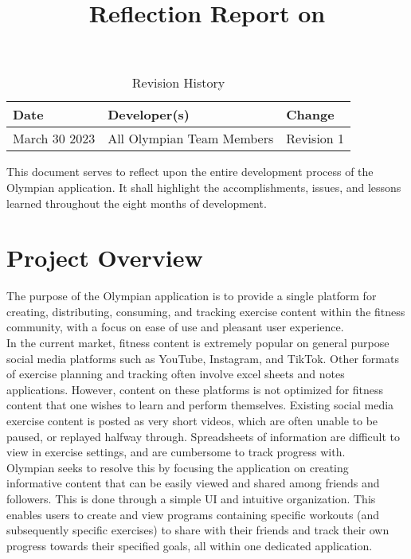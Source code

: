 \documentclass{article}
\title{Reflection Report on \progname}
\author{\authname}
\date{}
\begin{document}
\begin{table}[hp]
\caption{Revision History} \label{TblRevisionHistory}
\begin{tabularx}{\textwidth}{llX}
\toprule
\textbf{Date} & \textbf{Developer(s)} & \textbf{Change}\\
\midrule
March 30 2023 & All Olympian Team Members & Revision 1\\
\bottomrule
\end{tabularx}
\end{table}

\newpage

\maketitle

This document serves to reflect upon the entire development process of the Olympian application. It shall highlight the accomplishments, issues, and lessons learned throughout the eight months of development.

\section{Project Overview}


The purpose of the Olympian application is to provide a single platform for creating, distributing, consuming, and tracking exercise content within the fitness community, with a focus on ease of use and pleasant user experience.\\

In the current market, fitness content is extremely popular on general purpose social media platforms such as YouTube, Instagram, and TikTok. Other formats of exercise planning and tracking often involve excel sheets and notes applications. However, content on these platforms is not optimized for fitness content that one wishes to learn and perform themselves. Existing social media exercise content is posted as very short videos, which are often unable to be paused, or replayed halfway through. Spreadsheets of information are difficult to view in exercise settings, and are cumbersome to track progress with. \\

Olympian seeks to resolve this by focusing the application on creating informative content that can be easily viewed and shared among friends and followers. This is done through a simple UI and intuitive organization. This enables users to create and view programs containing specific workouts (and subsequently specific exercises) to share with their friends and track their own progress towards their specified goals, all within one dedicated application.
\end{document}
